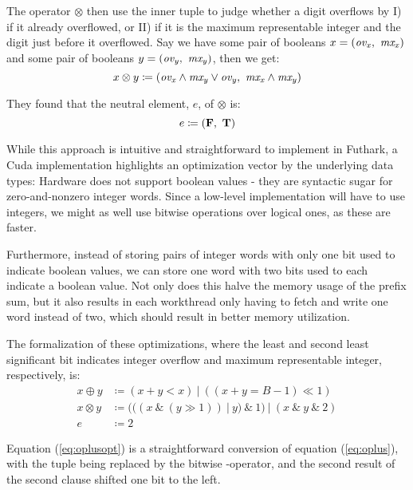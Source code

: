 The operator $\otimes$ then use the inner tuple to judge whether a digit overflows by
I) if it already overflowed, or II) if it is the maximum representable integer
and the digit just before it overflowed. Say we have some pair of booleans
$x = (\mathit{ov_x},~\mathit{mx_{x}})$ and some pair of booleans
$y = (\mathit{ov_y},~\mathit{mx_{y}})$, then we get:
\begin{equation}
  \label{eq:otimes}
  x \otimes y \coloneq (\mathit{ov_x} \land \mathit{mx_y} \lor \mathit{ov_y},~\mathit{mx_x} \land \mathit{mx_y})
\end{equation}

They found that the neutral element, $e$, of $\otimes$ is:
\begin{equation}
  \label{eq:otimesne}
  e \coloneq (\mathbf{F},~\mathbf{T})
\end{equation}

While this approach is intuitive and straightforward to implement in Futhark, a
Cuda implementation highlights an optimization vector by the underlying data
types: Hardware does not support boolean values - they are syntactic sugar for
zero-and-nonzero integer words. Since a low-level implementation will have to
use integers, we might as well use bitwise operations over logical ones, as
these are faster.

Furthermore, instead of storing pairs of integer words with only one bit used to
indicate boolean values, we can store one word with two bits used to each
indicate a boolean value. Not only does this halve the memory usage of the
prefix sum, but it also results in each workthread only having to fetch and
write one word instead of two, which should result in better memory utilization.

The formalization of these optimizations, where the least and second least
significant bit indicates integer overflow and maximum representable integer,
respectively, is:
\begin{align}
  \label{eq:oplusopt}
  x \oplus y &\coloneq (x + y < x)~|~((x + y = B-1) \ll 1) \\
  \label{eq:otimesopt}
  x \otimes y &\coloneq (((x~\&~(y \gg 1))~|~y)~\&~1)~|~(x~\&~y~\&~2)\\
  \label{eq:otimesneopt}
  e &\coloneq 2
\end{align}

Equation (\ref{eq:oplusopt}) is a straightforward conversion of equation
(\ref{eq:oplus}), with the tuple being replaced by the bitwise
-operator, and the second result of the second clause shifted one bit to
the left.

